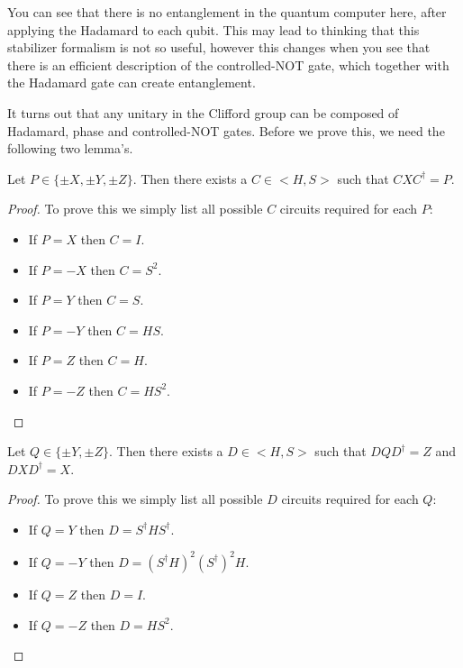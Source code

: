 \documentclass[12pt]{dalthesis}
\begin{document}
You can see that there is no entanglement in the quantum computer here, after applying the Hadamard to each qubit. This may lead to thinking that this stabilizer formalism is not so useful, however this changes when you see that there is an efficient description of the controlled-NOT gate, which together with the Hadamard gate can create entanglement. 

It turns out that any unitary in the Clifford group can be composed of Hadamard, phase and controlled-NOT gates. Before we prove this, we need the following two lemma's.

\begin{lemma}
\label{ConjX}
Let $P \in \{\pm X, \pm Y, \pm Z \}$. Then there exists a $C \in <H, S>$ such that $CXC^\dag = P$.
\end{lemma}
\begin{proof}
To prove this we simply list all possible $C$ circuits required for each $P$:
\begin{itemize}
\item If $P = X$ then $C = I$.
\item If $P = -X$ then $C = S^2$.
\item If $P = Y$ then $C = S$.
\item If $P = -Y$ then $C = HS$.
\item If $P = Z$ then $C = H$.
\item If $P = -Z$ then $C = HS^2$.
\end{itemize}
\end{proof}

\begin{lemma}
\label{ConjZ}
Let $Q \in \{\pm Y, \pm Z \}$. Then there exists a $D \in <H, S>$ such that $DQD^\dag = Z$ and $DXD^\dag = X$.
\end{lemma}
\begin{proof}
To prove this we simply list all possible $D$ circuits required for each $Q$:
\begin{itemize}
\item If $Q = Y$ then $D = S^\dag HS^\dag$.
\item If $Q = -Y$ then $D = (S^\dag H)^2 (S^\dag)^2 H$.
\item If $Q = Z$ then $D = I$.
\item If $Q = -Z$ then $D = HS^2$.
\end{itemize}
\end{proof}
\end{document}

